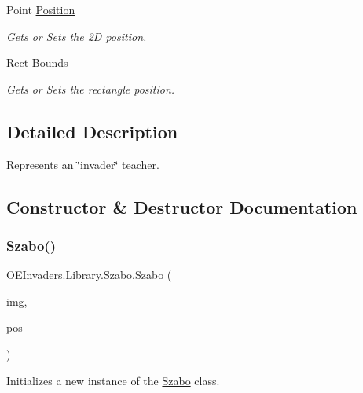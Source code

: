 \begin{DoxyCompactItemize}
Point \mbox{\hyperlink{class_o_e_invaders_1_1_library_1_1_szabo_a4e487030753eb2c808b72a1fe4300b82}{Position}}
\begin{DoxyCompactList}\small\item\em Gets or Sets the 2D position. \end{DoxyCompactList}\item 
Rect \mbox{\hyperlink{class_o_e_invaders_1_1_library_1_1_szabo_ac5b5a798988309da34767947c093348c}{Bounds}}
\begin{DoxyCompactList}\small\item\em Gets or Sets the rectangle position. \end{DoxyCompactList}\end{DoxyCompactItemize}


\subsection{Detailed Description}
Represents an \char`\"{}invader\char`\"{} teacher. 



\subsection{Constructor \& Destructor Documentation}
\mbox{\label{class_o_e_invaders_1_1_library_1_1_szabo_ae1df4344d4182e0d71d829bf89ee1e23}} 
\subsubsection{\texorpdfstring{Szabo()}{Szabo()}}
{\footnotesize\ttfamily O\+E\+Invaders.\+Library.\+Szabo.\+Szabo (\begin{DoxyParamCaption}\item[{Bitmap\+Source}]{img,  }\item[{Point}]{pos }\end{DoxyParamCaption})}



Initializes a new instance of the \mbox{\hyperlink{class_o_e_invaders_1_1_library_1_1_szabo}{Szabo}} class. 


